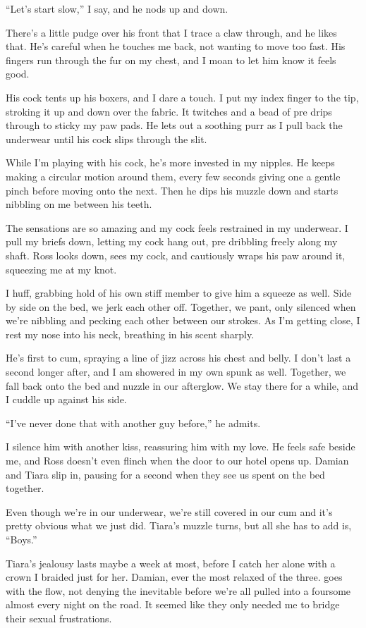 ``Let's start slow,'' I say, and he nods up and down.

There's a little pudge over his front that I trace a claw through, and
he likes that. He's careful when he touches me back, not wanting to move
too fast. His fingers run through the fur on my chest, and I moan to let
him know it feels good.

His cock tents up his boxers, and I dare a touch. I put my index finger
to the tip, stroking it up and down over the fabric. It twitches and a
bead of pre drips through to sticky my paw pads. He lets out a soothing
purr as I pull back the underwear until his cock slips through the slit.

While I'm playing with his cock, he's more invested in my nipples. He
keeps making a circular motion around them, every few seconds giving one
a gentle pinch before moving onto the next. Then he dips his muzzle down
and starts nibbling on me between his teeth.

The sensations are so amazing and my cock feels restrained in my
underwear. I pull my briefs down, letting my cock hang out, pre
dribbling freely along my shaft. Ross looks down, sees my cock, and
cautiously wraps his paw around it, squeezing me at my knot.

I huff, grabbing hold of his own stiff member to give him a squeeze as
well. Side by side on the bed, we jerk each other off. Together, we
pant, only silenced when we're nibbling and pecking each other between
our strokes. As I'm getting close, I rest my nose into his neck,
breathing in his scent sharply.

He's first to cum, spraying a line of jizz across his chest and belly. I
don't last a second longer after, and I am showered in my own spunk as
well. Together, we fall back onto the bed and nuzzle in our afterglow.
We stay there for a while, and I cuddle up against his side.

``I've never done that with another guy before,'' he admits.

I silence him with another kiss, reassuring him with my love. He feels
safe beside me, and Ross doesn't even flinch when the door to our hotel
opens up. Damian and Tiara slip in, pausing for a second when they see
us spent on the bed together.

Even though we're in our underwear, we're still covered in our cum and
it's pretty obvious what we just did. Tiara's muzzle turns, but all she
has to add is, ``Boys.''

Tiara's jealousy lasts maybe a week at most, before I catch her alone
with a crown I braided just for her. Damian, ever the most relaxed of
the three. goes with the flow, not denying the inevitable before we're
all pulled into a foursome almost every night on the road. It seemed
like they only needed me to bridge their sexual frustrations.

